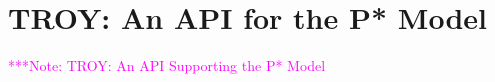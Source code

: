\documentclass[conference,final]{IEEEtran}
\makeatletter
\def\reduwave{\bgroup \markoverwith{\lower3.5\p@\hbox{\sixly \textcolor{red}{\char58}}}\ULon}
\newcommand{\terminology}[1]{ {\textcolor{red} {(Terminology used: \textbf{#1}) }}}
\newcommand{\jwave}[1]{ {\reduwave{#1}}}
\newcommand{\jhanote}[1]{ {\textcolor{red} { ***shantenu: #1 }}}
\newcommand{\alnote}[1]{ {\textcolor{blue} { ***andre: #1 }}}
\newcommand{\amnote}[1]{ {\textcolor{blue} { ***andre2: #1 }}}
\newcommand{\msnote}[1]{ {\textcolor{cyan} { ***mark: #1 }}}
\newcommand{\note}[1]{ {\textcolor{magenta} { ***Note: #1 }}}
\newcommand{\terminology}[1]{}
\newcommand{\jwave}[1]{#1}
\newcommand{\alnote}[1]{}
\newcommand{\amnote}[1]{}
\newcommand{\jhanote}[1]{}
\newcommand{\msnote}[1]{}
\newcommand{\note}[1]{}
\newcommand{\cu}{CU}
\newcommand{\upp}{\vspace*{-0.5em}}
\makeatother
\begin{document}


 



\section{TROY: An API for the P*  Model\upp\upp}
\note{TROY: An API Supporting the P* Model}






\end{document}
